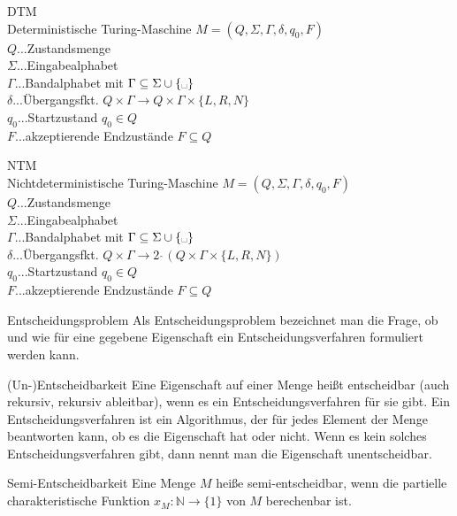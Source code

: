 \documentclass[a7paper,print,grid=both]{kartei}
\newcommand{\blank}{\text{\textvisiblespace}}
\begin{document}
\begin{karte}{DTM\\Deterministische Turing-Maschine}
$M=(Q,\Sigma,\Gamma,\delta,q_0,F)$\\
$Q$...Zustandsmenge\\
$\Sigma$...Eingabealphabet\\
$\Gamma$...Bandalphabet mit $\Gamma\subseteq\Sigma\cup\{\blank\}$\\
$\delta$...Übergangsfkt. $Q\times\Gamma\rightarrow Q\times\Gamma\times\{L,R,N\}$\\
$q_0$...Startzustand $q_0\in Q$\\
$F$...akzeptierende Endzustände $F \subseteq Q$
\end{karte}
\begin{karte}{NTM\\Nichtdeterministische Turing-Maschine}
$M=(Q,\Sigma,\Gamma,\delta,q_0,F)$\\
$Q$...Zustandsmenge\\
$\Sigma$...Eingabealphabet\\
$\Gamma$...Bandalphabet mit $\Gamma\subseteq\Sigma\cup\{\blank\}$\\
$\delta$...Übergangsfkt. $Q \times \Gamma \rightarrow 2~\widehat{\ } (Q \times \Gamma \times \{L,R,N\})$\\
$q_0$...Startzustand $q_0\in Q$\\
$F$...akzeptierende Endzustände $F \subseteq Q$
\end{karte}
\begin{karte}{Entscheidungsproblem}
Als Entscheidungsproblem bezeichnet man die Frage, ob und wie für eine gegebene Eigenschaft ein Entscheidungsverfahren formuliert werden kann.
\end{karte}
\begin{karte}{(Un-)Entscheidbarkeit}
Eine Eigenschaft auf einer Menge heißt entscheidbar (auch rekursiv, rekursiv ableitbar), wenn es ein Entscheidungsverfahren für sie gibt. Ein Entscheidungsverfahren ist ein Algorithmus, der für jedes Element der Menge beantworten kann, ob es die Eigenschaft hat oder nicht. Wenn es kein solches Entscheidungsverfahren gibt, dann nennt man die Eigenschaft unentscheidbar.
\end{karte}
\begin{karte}{Semi-Entscheidbarkeit}
Eine Menge $M$ heiße semi-entscheidbar, wenn die partielle charakteristische Funktion $x_M: \mathbb{N} \rightarrow \{1\}$ von $M$ berechenbar ist.\\
\end{karte}
\end{document}
